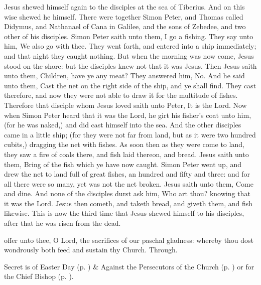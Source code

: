  Jesus shewed himself again to the disciples at the sea of Tiberius. And on this wise shewed he himself. There were together Simon Peter, and Thomas called Didymus, and Nathanael of Cana in Galilee, and the sons of Zebedee, and two other of his disciples. Simon Peter saith unto them, I go a fishing. They say unto him, We also go with thee. They went forth, and entered into a ship immediately; and that night they caught nothing. But when the morning was now come, Jesus stood on the shore: but the disciples knew not that it was Jesus. Then Jesus saith unto them, Children, have ye any meat? They answered him, No. And he said unto them, Cast the net on the right side of the ship, and ye shall find. They cast therefore, and now they were not able to draw it for the multitude of fishes. Therefore that disciple whom Jesus loved saith unto Peter, It is the Lord. Now when Simon Peter heard that it was the Lord, he girt his fisher's coat unto him, (for he was naked,) and did cast himself into the sea. And the other disciples came in a little ship; (for they were not far from land, but as it were two hundred cubits,) dragging the net with fishes. As soon then as they were come to land, they saw a fire of coals there, and fish laid thereon, and bread. Jesus saith unto them, Bring of the fish which ye have now caught. Simon Peter went up, and drew the net to land full of great fishes, an hundred and fifty and three: and for all there were so many, yet was not the net broken. Jesus saith unto them, Come and dine. And none of the disciples durst ask him, Who art thou? knowing that it was the Lord. Jesus then cometh, and taketh bread, and giveth them, and fish likewise. This is now the third time that Jesus shewed himself to his disciples, after that he was risen from the dead.


\secret
{} offer unto thee, O Lord, the sacrifices of our paschal gladness: whereby thou dost wondrously both feed and sustain thy Church. Through.
\begin{rubric}
     Secret is of Easter Day (p. \pageref{EasterSecret}) \&  Against the Persecutors of the Church (p. \pageref{SPAgainst}) or for the Chief Bishop (p. \pageref{SPChiefBishop}).
\end{rubric}


